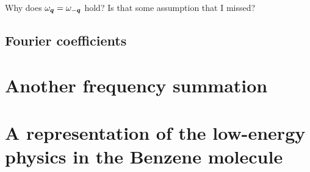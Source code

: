 \documentclass[11pt, english, fleqn, DIV=15, headinclude, BCOR=1cm]{scrartcl}
\begin{document}
\begin{question}
    Why does $\omegaq = \omegamq$ hold? Is that some assumption that I missed?
\end{question}

\subsection{Fourier coefficients}

\section{Another frequency summation}
\label{homework:2}

\section[Benzene]{A representation of the low-energy physics in the Benzene molecule}
\label{homework:3}
\end{document}
